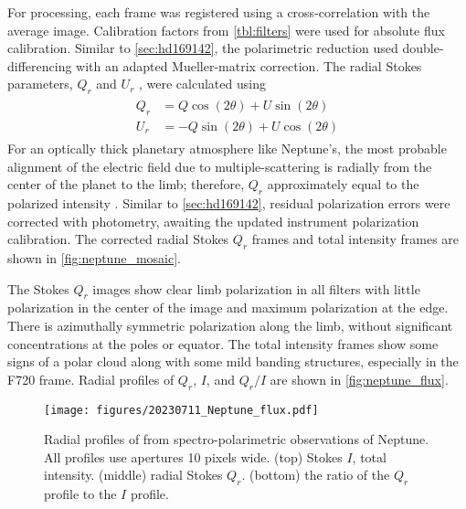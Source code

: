 For processing, each frame was registered using a cross-correlation with the average image. Calibration factors from \autoref{tbl:filters} were used for absolute flux calibration. Similar to \autoref{sec:hd169142}, the polarimetric reduction used double-differencing with an adapted Mueller-matrix correction. The radial Stokes parameters, $Q_r$ and $U_r$ \citep{schmid_limb_2006}, were calculated using
\begin{align}
    \label{eqn:rad_stokes}
\begin{split}
    Q_r &= Q\cos{\left(2\theta\right)} + U\sin{\left(2\theta\right)} \\
    U_r &= -Q\sin{\left(2\theta\right)} + U\cos{\left(2\theta\right)}
\end{split}
\end{align}
For an optically thick planetary atmosphere like Neptune's, the most probable alignment of the electric field due to multiple-scattering is radially from the center of the planet to the limb; therefore, $Q_r$ approximately equal to the polarized intensity \citep{schmid_limb_2006}. Similar to \autoref{sec:hd169142}, residual polarization errors were corrected with photometry, awaiting the updated instrument polarization calibration. The corrected radial Stokes $Q_r$ frames and total intensity frames are shown in \autoref{fig:neptune_mosaic}.

The Stokes $Q_r$ images show clear limb polarization in all filters with little polarization in the center of the image and maximum polarization at the edge. There is azimuthally symmetric polarization along the limb, without significant concentrations at the poles or equator. The total intensity frames show some signs of a polar cloud along with some mild banding structures, especially in the F720 frame. Radial profiles of $Q_r$, $I$, and $Q_r/I$ are shown in \autoref{fig:neptune_flux}.

\begin{figure}
    \centering
    \texttt{[image: figures/20230711\_Neptune\_flux.pdf]}
    \caption{Radial profiles of from spectro-polarimetric observations of Neptune. All profiles use apertures 10 pixels wide. (top) Stokes $I$, total intensity. (middle) radial Stokes $Q_r$. (bottom) the ratio of the $Q_r$ profile to the $I$ profile.\label{fig:neptune_flux}}
\end{figure}
